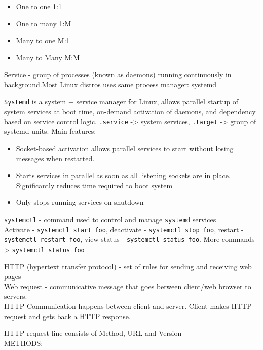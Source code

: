 \documentclass[11pt]{article}
\begin{document}
\begin{itemize}
\item
  One to one 1:1\\
\item
  One to many 1:M\\
\item
  Many to one M:1\\
\item
  Many to Many M:M
\end{itemize}

Service - group of processes (known as daemons) running continuously in
background.Most Linux distros uses same process manager: systemd

\texttt{Systemd} is a system + service manager for Linux, allows
parallel startup of system services at boot time, on-demand activation
of daemons, and dependency based on service control logic.
\texttt{.service} -\textgreater{} system services, \texttt{.target}
-\textgreater{} group of systemd units. Main features:

\begin{itemize}
\item
  Socket-based activation allows parallel services to start without
  losing messages when restarted.\\
\item
  Starts services in parallel as soon as all listening sockets are in
  place. Significantly reduces time required to boot system\\
\item
  Only stops running services on shutdown
\end{itemize}

\texttt{systemctl} - command used to control and manage \texttt{systemd}
services\\
Activate - \texttt{systemctl\ start\ foo}, deactivate -
\texttt{systemctl\ stop\ foo}, restart -
\texttt{systemctl\ restart\ foo}, view status -
\texttt{systemctl\ status\ foo}. More commands -\textgreater{}
\texttt{systemctl\ status\ foo}

HTTP (hypertext transfer protocol) - set of rules for sending and
receiving web pages\\
Web request - communicative message that goes between client/web browser
to servers.\\
HTTP Communication happens between client and server. Client makes HTTP
request and gets back a HTTP response.

HTTP request line consists of Method, URL and Version\\
METHODS:
\end{document}
